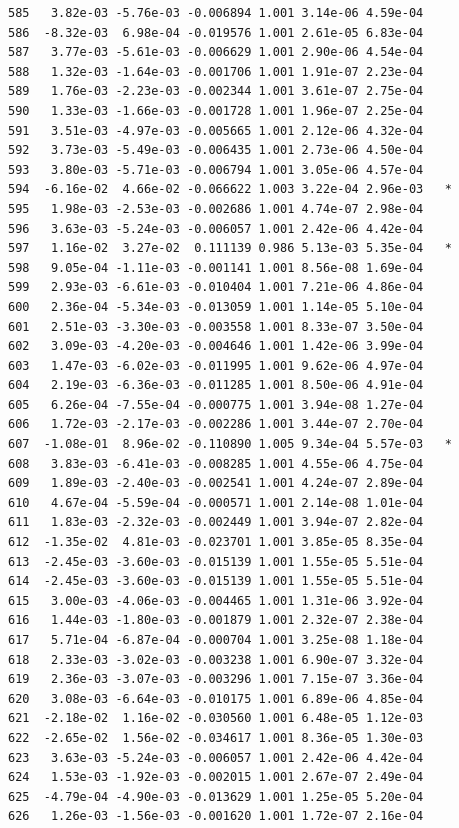 \documentclass[
  letterpaper,
  DIV=11,
  numbers=noendperiod]{scrartcl}
\begin{document}
\begin{verbatim}
585   3.82e-03 -5.76e-03 -0.006894 1.001 3.14e-06 4.59e-04    
586  -8.32e-03  6.98e-04 -0.019576 1.001 2.61e-05 6.83e-04    
587   3.77e-03 -5.61e-03 -0.006629 1.001 2.90e-06 4.54e-04    
588   1.32e-03 -1.64e-03 -0.001706 1.001 1.91e-07 2.23e-04    
589   1.76e-03 -2.23e-03 -0.002344 1.001 3.61e-07 2.75e-04    
590   1.33e-03 -1.66e-03 -0.001728 1.001 1.96e-07 2.25e-04    
591   3.51e-03 -4.97e-03 -0.005665 1.001 2.12e-06 4.32e-04    
592   3.73e-03 -5.49e-03 -0.006435 1.001 2.73e-06 4.50e-04    
593   3.80e-03 -5.71e-03 -0.006794 1.001 3.05e-06 4.57e-04    
594  -6.16e-02  4.66e-02 -0.066622 1.003 3.22e-04 2.96e-03   *
595   1.98e-03 -2.53e-03 -0.002686 1.001 4.74e-07 2.98e-04    
596   3.63e-03 -5.24e-03 -0.006057 1.001 2.42e-06 4.42e-04    
597   1.16e-02  3.27e-02  0.111139 0.986 5.13e-03 5.35e-04   *
598   9.05e-04 -1.11e-03 -0.001141 1.001 8.56e-08 1.69e-04    
599   2.93e-03 -6.61e-03 -0.010404 1.001 7.21e-06 4.86e-04    
600   2.36e-04 -5.34e-03 -0.013059 1.001 1.14e-05 5.10e-04    
601   2.51e-03 -3.30e-03 -0.003558 1.001 8.33e-07 3.50e-04    
602   3.09e-03 -4.20e-03 -0.004646 1.001 1.42e-06 3.99e-04    
603   1.47e-03 -6.02e-03 -0.011995 1.001 9.62e-06 4.97e-04    
604   2.19e-03 -6.36e-03 -0.011285 1.001 8.50e-06 4.91e-04    
605   6.26e-04 -7.55e-04 -0.000775 1.001 3.94e-08 1.27e-04    
606   1.72e-03 -2.17e-03 -0.002286 1.001 3.44e-07 2.70e-04    
607  -1.08e-01  8.96e-02 -0.110890 1.005 9.34e-04 5.57e-03   *
608   3.83e-03 -6.41e-03 -0.008285 1.001 4.55e-06 4.75e-04    
609   1.89e-03 -2.40e-03 -0.002541 1.001 4.24e-07 2.89e-04    
610   4.67e-04 -5.59e-04 -0.000571 1.001 2.14e-08 1.01e-04    
611   1.83e-03 -2.32e-03 -0.002449 1.001 3.94e-07 2.82e-04    
612  -1.35e-02  4.81e-03 -0.023701 1.001 3.85e-05 8.35e-04    
613  -2.45e-03 -3.60e-03 -0.015139 1.001 1.55e-05 5.51e-04    
614  -2.45e-03 -3.60e-03 -0.015139 1.001 1.55e-05 5.51e-04    
615   3.00e-03 -4.06e-03 -0.004465 1.001 1.31e-06 3.92e-04    
616   1.44e-03 -1.80e-03 -0.001879 1.001 2.32e-07 2.38e-04    
617   5.71e-04 -6.87e-04 -0.000704 1.001 3.25e-08 1.18e-04    
618   2.33e-03 -3.02e-03 -0.003238 1.001 6.90e-07 3.32e-04    
619   2.36e-03 -3.07e-03 -0.003296 1.001 7.15e-07 3.36e-04    
620   3.08e-03 -6.64e-03 -0.010175 1.001 6.89e-06 4.85e-04    
621  -2.18e-02  1.16e-02 -0.030560 1.001 6.48e-05 1.12e-03    
622  -2.65e-02  1.56e-02 -0.034617 1.001 8.36e-05 1.30e-03    
623   3.63e-03 -5.24e-03 -0.006057 1.001 2.42e-06 4.42e-04    
624   1.53e-03 -1.92e-03 -0.002015 1.001 2.67e-07 2.49e-04    
625  -4.79e-04 -4.90e-03 -0.013629 1.001 1.25e-05 5.20e-04    
626   1.26e-03 -1.56e-03 -0.001620 1.001 1.72e-07 2.16e-04    

\end{verbatim}
\end{document}
